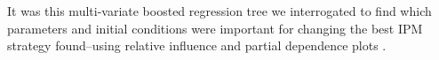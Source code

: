 \documentclass[9pt,twocolumn,twoside,lineno]{pnas-new}
\begin{document}
{It was this multi-variate boosted regression tree we interrogated to find which parameters and initial conditions were important for changing the best IPM strategy found--using relative influence and partial dependence plots \citep{Mill2016}.    

}

\showmatmethods %


\showacknow %


 
\end{document}
